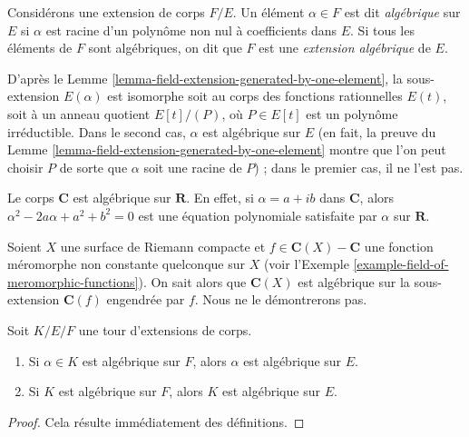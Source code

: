 \begin{definition}
\label{definition-algebraic}
Considérons une extension de corps $F/E$. Un élément $\alpha \in F$ est dit
{\it algébrique} sur $E$ si $\alpha$ est racine d'un polynôme non nul
à coefficients dans $E$. Si tous les éléments de $F$ sont algébriques, on dit que $F$ est
une {\it extension algébrique} de $E$.
\end{definition}

\noindent
D'après le Lemme \ref{lemma-field-extension-generated-by-one-element}, la
sous-extension $E(\alpha)$ est isomorphe soit au corps des fonctions rationnelles
$E(t)$, soit à un anneau quotient $E[t]/(P)$, où $P \in E[t]$ est un
polynôme irréductible. Dans le second cas, $\alpha$ est algébrique sur
$E$ (en fait, la preuve du
Lemme \ref{lemma-field-extension-generated-by-one-element}
montre que l'on peut choisir $P$ de sorte que $\alpha$ soit une racine de $P$) ;
dans le premier cas, il ne l'est pas.

\begin{example}
\label{example-C-algebraic-over-R}
Le corps $\mathbf{C}$ est algébrique sur $\mathbf{R}$. En effet, si
$\alpha = a + ib$ dans $\mathbf{C}$, alors $\alpha^2 - 2a\alpha + a^2 + b^2 = 0$
est une équation polynomiale satisfaite par $\alpha$ sur $\mathbf{R}$.
\end{example}

\begin{example}
\label{example-compact-riemann-surface-is-finite-over-P1}
Soient $X$ une surface de Riemann compacte et
$f \in \mathbf{C}(X) - \mathbf{C}$ une fonction méromorphe non constante quelconque
sur $X$ (voir l'Exemple \ref{example-field-of-meromorphic-functions}). On sait alors
que $\mathbf{C}(X)$ est algébrique sur la sous-extension
$\mathbf{C}(f)$ engendrée par $f$. Nous ne le démontrerons pas.
\end{example}

\begin{lemma}
\label{lemma-algebraic-goes-up}
Soit $K/E/F$ une tour d'extensions de corps.
\begin{enumerate}
\item Si $\alpha \in K$ est algébrique sur $F$, alors $\alpha$ est algébrique
sur $E$.
\item Si $K$ est algébrique sur $F$, alors $K$ est algébrique sur $E$.
\end{enumerate}
\end{lemma}

\begin{proof}
Cela résulte immédiatement des définitions.
\end{proof}

